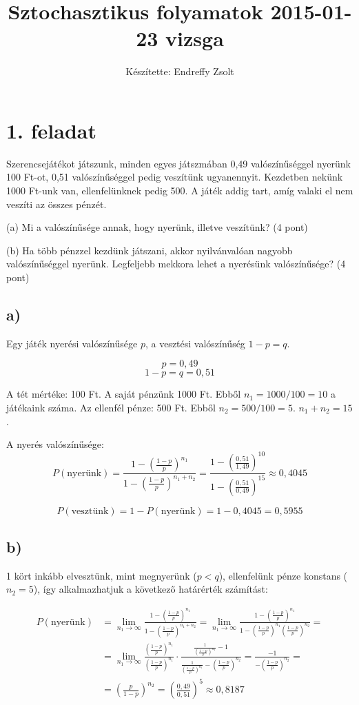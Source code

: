 \documentclass[a4paper,12pt]{article}   		%
\title{Sztochasztikus folyamatok 2015-01-23 vizsga}
\author{Készítette: Endreffy Zsolt}
\begin{document}
\maketitle
\section*{1. feladat}
Szerencsejátékot játszunk, minden egyes játszmában 0,49 valószínűséggel
nyerünk 100 Ft-ot, 0,51 valószínűséggel pedig veszítünk ugyanennyit. 
Kezdetben nekünk 1000 Ft-unk van, ellenfelünknek pedig 500. A játék
addig tart, amíg valaki el nem veszíti az összes pénzét.

\noindent
(a) Mi a valószínűsége annak, hogy nyerünk, illetve veszítünk? (4 pont)

\noindent
(b) Ha több pénzzel kezdünk játszani, akkor nyilvánvalóan nagyobb 
valószínűséggel nyerünk. Legfeljebb mekkora lehet a nyerésünk
valószínűsége? (4 pont)
\subsection*{a)}
Egy játék nyerési valószínűsége $p$, a vesztési valószínűség $1-p=q$.

\[p = 0,49\]
\[1-p = q = 0,51\]

A tét mértéke: 100 Ft. A saját pénzünk 1000 Ft. Ebből $n_1 = 1000/100=10$ a 
játékaink száma. Az ellenfél pénze: 500 Ft. Ebből $n_2 = 500/100=5$.
$n_1 + n_2 = 15$.

A nyerés valószínűsége:
\[P(\text{nyerünk}) = \frac{1-\left(\frac{1-p}{p}\right)^{n_1}}
{1-\left(\frac{1-p}{p}\right)^{n_1+n_2}} = 
\frac{1-\left(\frac{0,51}{1,49}\right)^{10}}
{1-\left(\frac{0,51}{0,49}\right)^{15}} \approx 0,4045 \]

\[P(\text{vesztünk}) = 1 - P(\text{nyerünk}) = 1 - 0,4045 = 0,5955\]

\subsection*{b)}
1 kört inkább elvesztünk, mint megnyerünk ($p<q$), ellenfelünk pénze konstans
($n_2 = 5$), így alkalmazhatjuk a következő határérték számítást:

\[
\begin{split}
P(\text{nyerünk}) &= 
\lim_{n_1 \to \infty} \frac{1-\left(\frac{1-p}{p}\right)^{n_1}}
{1-\left(\frac{1-p}{p}\right)^{n_1+n_2}} =
\lim_{n_1 \to \infty} \frac{1-\left(\frac{1-p}{p}\right)^{n_1}}
{1-\left(\frac{1-p}{p}\right)^{n_1}\left(\frac{1-p}{p}\right)^{n_2}} =\\
&= \lim_{n_1 \to \infty} \frac{\left(\frac{1-p}{p}\right)^{n_1}}
{\left(\frac{1-p}{p}\right)^{n_1}} \cdot 
\frac{\frac{1}{\left(\frac{1-p}{p}\right)^{n_1}}-1}
{\frac{1}{\left(\frac{1-p}{p}\right)^{n_1}} -
\left(\frac{1-p}{p}\right)^{n_2}} 
= \frac{-1}{-\left(\frac{1-p}{p}\right)^{n_2}} =\\
&= \left(\frac{p}{1-p}\right)^{n_2} = 
\left(\frac{0,49}{0,51}\right)^{5} \approx 0,8187
\end{split}
\]
\end{document}
